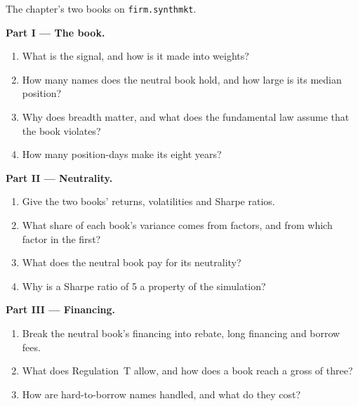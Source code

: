 \begin{problem}\label{pb:s1:anatomy-of-a-stat-arb-book:1}
The chapter's two books on \texttt{firm.synthmkt}.

\medskip\noindent\textbf{Part I --- The book.}
\begin{enumerate}
\item What is the signal, and how is it made into weights?
\item How many names does the neutral book hold, and how large is its median position?
\item Why does breadth matter, and what does the fundamental law assume that the book violates?
\item How many position-days make its eight years?
\end{enumerate}

\medskip\noindent\textbf{Part II --- Neutrality.}
\begin{enumerate}[resume]
\item Give the two books' returns, volatilities and Sharpe ratios.
\item What share of each book's variance comes from factors, and from which factor in the first?
\item What does the neutral book pay for its neutrality?
\item Why is a Sharpe ratio of 5 a property of the simulation?
\end{enumerate}

\medskip\noindent\textbf{Part III --- Financing.}
\begin{enumerate}[resume]
\item Break the neutral book's financing into rebate, long financing and borrow fees.
\item What does Regulation~T allow, and how does a book reach a gross of three?
\item How are hard-to-borrow names handled, and what do they cost?
\end{enumerate}


\end{problem}

